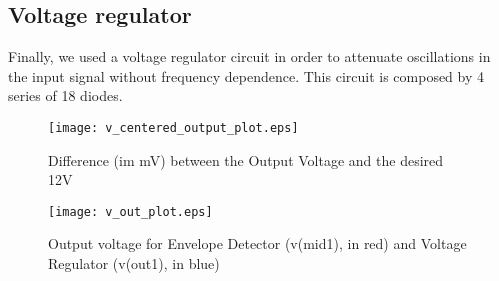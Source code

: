 \subsection{Voltage regulator}
Finally, we used a voltage regulator circuit in order to attenuate oscillations in the input signal without frequency dependence. This circuit is composed by 4 series of 18 diodes.

\begin{figure}[H] \centering
\texttt{[image: v\_centered\_output\_plot.eps]}
\caption{Difference (im mV) between the Output Voltage and the desired 12V}
\label{fig:phase_sim}
\end{figure}

\begin{figure}[H] \centering
\texttt{[image: v\_out\_plot.eps]}
\caption{Output voltage for Envelope Detector (v(mid1), in red) and Voltage Regulator (v(out1), in blue)}
\label{fig:phase_sim}
\end{figure}
